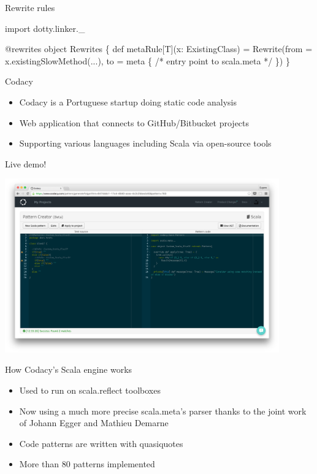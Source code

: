 \documentclass[svgnames,dvipsnames,hyperref={bookmarks=false},usepdftitle=false]{beamer}
\begin{document}
\begin{frame}[fragile]{Rewrite rules}
\begin{semiverbatim}
import dotty.linker._

@rewrites
object Rewrites \{
  def metaRule[T](x: ExistingClass) =
    Rewrite(from = x.existingSlowMethod(...),
              to = meta \{ /* entry point to scala.meta */ \})
\}
\end{semiverbatim}
\end{frame}


\begin{frame}{Codacy}
\begin{itemize}
\item Codacy is a Portuguese startup doing static code analysis
\item Web application that connects to GitHub/Bitbucket projects
\item Supporting various languages including Scala via open-source tools
\end{itemize}
\end{frame}

\begin{frame}[c, fragile]{Live demo!}
\begin{center}
\includegraphics[height=7.5cm]{codacy.png}
\end{center}
\end{frame}

\begin{frame}{How Codacy's Scala engine works}
\begin{itemize}
\item Used to run on scala.reflect toolboxes
\item Now using a much more precise scala.meta's parser thanks to the joint work of Johann Egger and Mathieu Demarne
\item Code patterns are written with quasiquotes
\item More than 80 patterns implemented
\end{itemize}
\end{frame}
\end{document}
